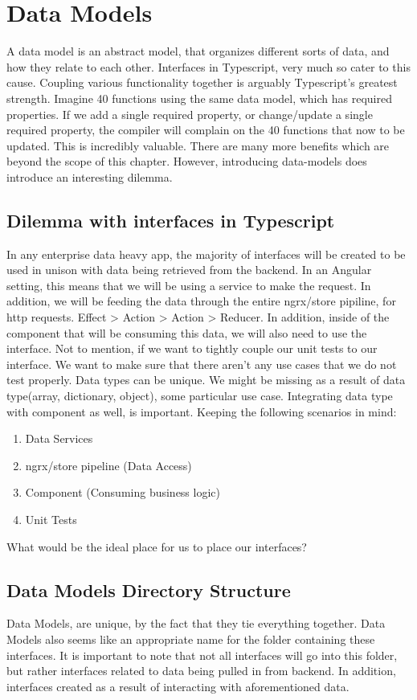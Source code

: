 \section{ Data Models }


A data model is an abstract model, that organizes different sorts of data,
and how they relate to each other. Interfaces in Typescript, very much so cater
to this cause. Coupling various functionality together is arguably Typescript's
greatest strength. Imagine 40 functions using the same data model, which has
required properties. If we add a single required property, or change/update
a single required property, the compiler will complain on the 40 functions that
now to be updated. This is incredibly valuable. There are many more benefits
which are beyond the scope of this chapter. However, introducing data-models
does introduce an interesting dilemma.

\subsection{Dilemma with interfaces in Typescript}
In any enterprise data heavy app, the majority of interfaces will
be created to be used in unison with data being retrieved from the backend.
In an Angular setting, this means that we will be using a service to make the
request. In addition, we will be feeding the data through the entire ngrx/store
pipiline, for http requests. Effect > Action > Action > Reducer. In addition,
inside of the component that will be consuming this data, we will also need
to use the interface. Not to mention, if we want to tightly couple our unit
tests to our interface. We want to make sure that there aren't any use cases
that we do not test properly. Data types can be unique. We might be missing as a result of data type(array, dictionary, object), some particular use case.
Integrating data type with component as well, is important. Keeping the
following scenarios in mind:
\begin{enumerate}
  \item Data Services
  \item ngrx/store pipeline (Data Access)
  \item Component (Consuming business logic)
  \item Unit Tests
\end{enumerate}

What would be the ideal place for us to place our interfaces?

\subsection{Data Models Directory Structure}
Data Models, are unique, by the fact that they tie everything together. Data
Models also seems like an appropriate name for the folder containing these interfaces. It is important to note that not all interfaces will go into this folder, but rather interfaces related to data being pulled in from backend. In addition, interfaces created as a result of interacting with aforementioned
data.

